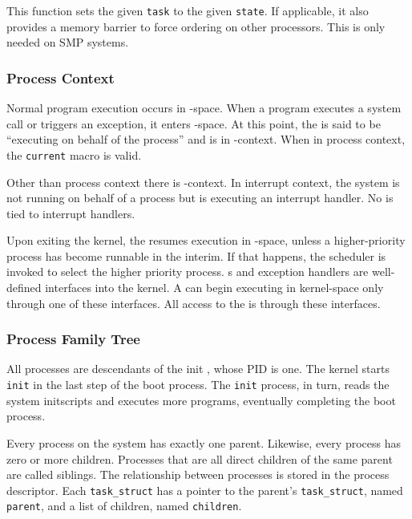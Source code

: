 This function sets the given \texttt{task} to the given \texttt{state}.
If applicable, it also provides a memory barrier to force ordering on other processors.
This is only needed on SMP systems.

\subsubsection{Process Context}\label{subsubsec:Process_Context}
Normal program execution occurs in -space.
When a program executes a system call or triggers an exception, it enters -space.
At this point, the  is said to be ``executing on behalf of the process'' and is in -context.
When in process context, the \texttt{current} macro is valid.

\begin{remark*}
  Other than process context there is -context.
  In interrupt context, the system is not running on behalf of a process but is executing an interrupt handler.
  No  is tied to interrupt handlers.
\end{remark*}

Upon exiting the kernel, the  resumes execution in -space, unless a higher-priority process has become runnable in the interim.
If that happens, the scheduler is invoked to select the higher priority process.
s and exception handlers are well-defined interfaces into the kernel.
A  can begin executing in kernel-space only through one of these interfaces.
All access to the  is through these interfaces.

\subsubsection{Process Family Tree}\label{subsubsec:Process_Family_Tree}
All processes are descendants of the init , whose PID is one.
The kernel starts \texttt{init} in the last step of the boot process.
The \texttt{init} process, in turn, reads the system initscripts and executes more programs, eventually completing the boot process.

Every process on the system has exactly one parent.
Likewise, every process has zero or more children.
Processes that are all direct children of the same parent are called siblings.
The relationship between processes is stored in the process descriptor.
Each \texttt{task_struct} has a pointer to the parent’s \texttt{task_struct}, named \texttt{parent}, and a list of children, named \texttt{children}.

